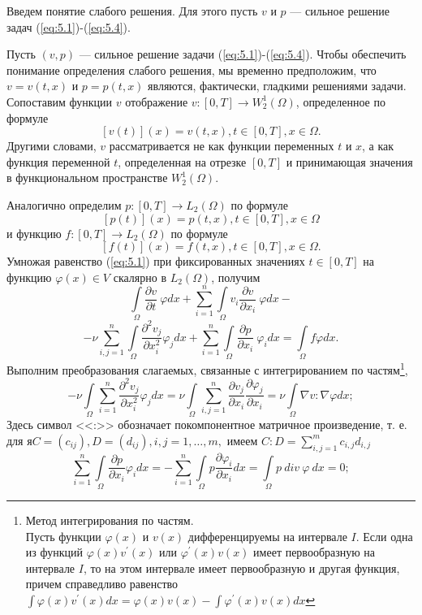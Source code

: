 Введем понятие слабого решения. Для этого пусть $v$ и $p$ --- сильное решение задач (\ref{eq:5.1})-(\ref{eq:5.4}).

Пусть $(v, p)$ --- сильное решение задачи (\ref{eq:5.1})-(\ref{eq:5.4}).
Чтобы обеспечить понимание определения слабого решения, мы временно предположим, что $v=v(t, x)$ и $p=p(t, x)$ являются, фактически, гладкими решениями задачи.
Сопоставим функции $v$ отображение $v:[0, T]\rightarrow W^1_2(\Omega)$, определенное по формуле $$[v(t)](x)=v(t, x), t\in[0, T], x\in\Omega.$$
Другими словами, $v$ рассматривается не как функции переменных $t$ и $x$, а как функция переменной $t$, определенная на отрезке
$[0, T]$ и принимающая значения в функциональном пространстве $W^1_2(\Omega)$.

Аналогично определим $p:[0, T]\rightarrow L_2(\Omega)$ по формуле $$[p(t)](x)=p(t, x), t\in[0, T], x\in\Omega$$
и функцию $f:[0, T]\rightarrow L_2(\Omega)$ по формуле $$[f(t)](x)=f(t, x), t\in[0, T], x\in\Omega.$$
Умножая равенство (\ref{eq:5.1}) при фиксированных значениях $t\in [0, T]$ на функцию $\varphi (x)\in V$ скалярно в $L_2(\Omega)$, получим
$$\int\limits_\Omega \frac{\partial v}{\partial t}\ \varphi dx+\sum_{i=1}^n\int\limits_\Omega v_i\frac{\partial v}{\partial x_i}\ \varphi dx-$$
$$-\nu \sum_{i, j=1}^n\int\limits_\Omega\frac{\partial^2 v_j}{\partial x^{2}_i} \varphi_j dx+
\sum_{i=1}^n\int\limits_\Omega \frac{\partial p}{\partial x_i}\ \varphi_idx=\int\limits_\Omega f\varphi dx.$$
Выполним преобразования слагаемых, связанные с интегрированием по частям\footnote{Метод интегрирования по частям.\\
Пусть функции $\varphi (x)$ и 
$v(x)$ дифференцируемы на интервале $I$. Если одна из функций $\varphi (x) v^\prime(x)$ или $\varphi^\prime (x) v(x)$ имеет первообразную
на интервале $I$, то на этом интервале имеет первообразную и другая функция, причем справедливо равенство 
$\int\varphi (x) v^\prime(x)dx=\varphi (x) v(x)-\int\varphi^\prime(x) v(x)dx$},
$$-\nu\int\limits_\Omega \sum_{i=1}^{n}\frac{\partial^2 v_j}{\partial x^{2}_i}\varphi_j dx=
\nu\int\limits_\Omega\sum_{i, j=1}^{n}\frac{\partial v_j}{\partial x_i}\frac{\partial \varphi_j}{\partial x_i}=\nu\int\limits_\Omega \nabla v:\nabla\varphi dx;$$
Здесь символ <<:>> обозначает покомпонентное матричное произведение, т. е. для $я C=(c_{ij}), D=(d_{ij}), i, j=1,\ldots,m,$ имеем $C:D=\sum\limits_{i, j=1}^{m} c_{i, j}d_{i, j}$
$$\sum_{i=1}^{n}\int\limits_\Omega \frac{\partial p}{\partial x_i}\varphi_i dx
=-\sum_{i=1}^{n}\int\limits_\Omega p\frac{\partial \varphi_i}{\partial x_i}dx= \int\limits_\Omega p \ div \ \varphi \ dx=0;$$

